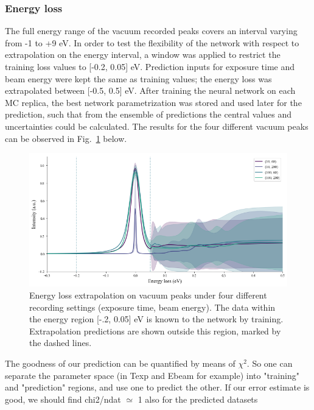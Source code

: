 \subsubsection{Energy loss}
\label{sec:eloss}

The full energy range of the vacuum recorded peaks covers an interval varying from -1 to +9 eV. In order to test the flexibility of the network with respect to extrapolation on the energy interval, a window was applied to restrict the training loss values to [-0.2, 0.05] eV. Prediction inputs for exposure time and beam energy were kept the same as training values; the energy loss was extrapolated between [-0.5, 0.5] eV. After training the neural network on each MC replica, the best network parametrization was stored and used later for the prediction, such that from the ensemble of predictions the central values and uncertainties could be calculated. The results for the four different vacuum peaks can be observed in Fig.~\ref{fig:extrapoleloss} below. 

\begin{figure}[H]
    \centering
    \includegraphics[width=120mm]{plots/extrapolate_energyloss.png}
    \caption{Energy loss extrapolation on vacuum peaks under four different recording settings (exposure time, beam energy). The data within the energy region [-.2, 0.05] eV is known to the network by training. Extrapolation predictions are shown outside this region, marked by the dashed lines.}
    \label{fig:extrapoleloss}
\end{figure}

The goodness of our prediction can be quantified by means of $\chi^2$. So one can separate the parameter space (in Texp and Ebeam for example) into "training" and "prediction" regions, and use one to predict the other. If our error estimate is good, we should find chi2/ndat $\simeq$ 1 also for the predicted datasets


